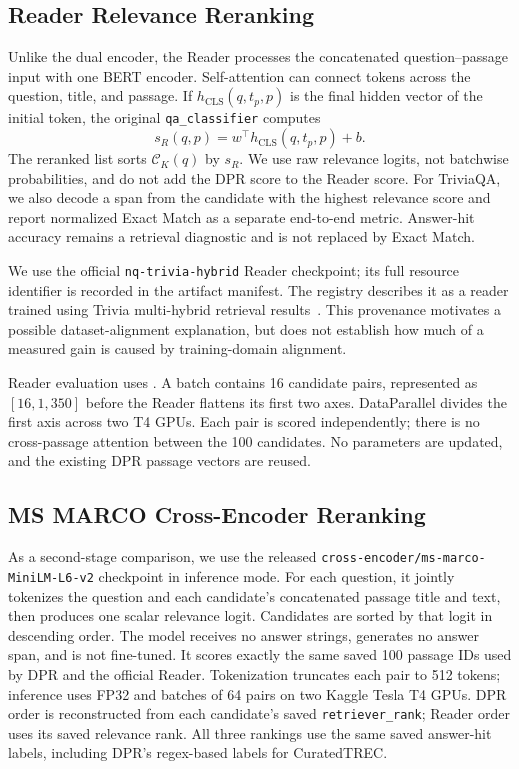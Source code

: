 \subsection{Reader Relevance Reranking}
Unlike the dual encoder, the Reader processes the concatenated question--passage input with one BERT encoder. Self-attention can connect tokens across the question, title, and passage. If $h_{\mathrm{CLS}}(q,t_p,p)$ is the final hidden vector of the initial token, the original \texttt{qa\_classifier} computes
\begin{equation}
s_R(q,p)=w^{\top}h_{\mathrm{CLS}}(q,t_p,p)+b.
\label{eq:reader}
\end{equation}
The reranked list sorts $\mathcal{C}_K(q)$ by $s_R$. We use raw relevance logits, not batchwise probabilities, and do not add the DPR score to the Reader score. For TriviaQA, we also decode a span from the candidate with the highest relevance score and report normalized Exact Match as a separate end-to-end metric. Answer-hit accuracy remains a retrieval diagnostic and is not replaced by Exact Match.

We use the official \texttt{nq-trivia-hybrid} Reader checkpoint; its full resource identifier is recorded in the artifact manifest. The registry describes it as a reader trained using Trivia multi-hybrid retrieval results~\cite{dprcode}. This provenance motivates a possible dataset-alignment explanation, but does not establish how much of a measured gain is caused by training-domain alignment.

Reader evaluation uses . A batch contains 16 candidate pairs, represented as $[16,1,350]$ before the Reader flattens its first two axes. DataParallel divides the first axis across two T4 GPUs. Each pair is scored independently; there is no cross-passage attention between the 100 candidates. No parameters are updated, and the existing DPR passage vectors are reused.

\subsection{MS MARCO Cross-Encoder Reranking}
As a second-stage comparison, we use the released \texttt{cross-encoder/ms-marco-MiniLM-L6-v2} checkpoint in inference mode. For each question, it jointly tokenizes the question and each candidate's concatenated passage title and text, then produces one scalar relevance logit. Candidates are sorted by that logit in descending order. The model receives no answer strings, generates no answer span, and is not fine-tuned. It scores exactly the same saved 100 passage IDs used by DPR and the official Reader. Tokenization truncates each pair to 512 tokens; inference uses FP32 and batches of 64 pairs on two Kaggle Tesla T4 GPUs. DPR order is reconstructed from each candidate's saved \texttt{retriever\_rank}; Reader order uses its saved relevance rank. All three rankings use the same saved answer-hit labels, including DPR's regex-based labels for CuratedTREC.

